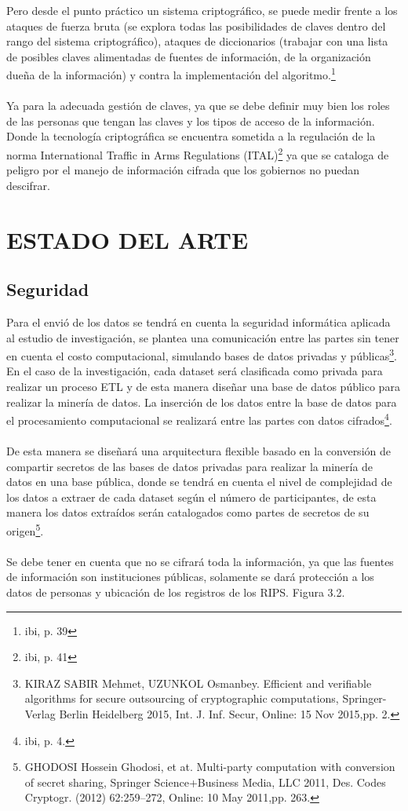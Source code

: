 \documentclass[a4paper,openright,12pt]{book}
\theoremstyle{definition}
\theoremstyle{remark}
\begin{document}
Pero desde el punto práctico un sistema criptográfico, se puede medir frente a los ataques de fuerza bruta (se explora todas las posibilidades de claves dentro del rango del sistema criptográfico),  ataques de diccionarios (trabajar con una lista de posibles claves alimentadas de fuentes de información, de la organización dueña de la información) y contra la implementación del algoritmo.\footnote{ibi, p. 39}\\\\
Ya para la adecuada gestión de claves, ya que se debe definir muy bien los roles de las personas que tengan las claves y los tipos de acceso de la información. Donde la tecnología criptográfica se encuentra sometida a la regulación de la norma International Traffic in Arms Regulations (ITAL)\footnote{ibi, p. 41} ya que se cataloga de peligro por el manejo de información cifrada que los gobiernos no puedan descifrar.  

\section{ESTADO DEL ARTE}
	\subsection{Seguridad}
Para el envió de los datos se tendrá en cuenta la seguridad informática aplicada al estudio de investigación, se plantea una comunicación entre las partes sin tener en cuenta el costo computacional, simulando bases de datos privadas y públicas\footnote{KIRAZ SABIR Mehmet, UZUNKOL Osmanbey. Efficient and verifiable algorithms for secure outsourcing of cryptographic computations, Springer-Verlag Berlin Heidelberg 2015, Int. J. Inf. Secur, Online: 15 Nov 2015,pp. 2.}. En el caso de la investigación, cada dataset será clasificada como privada para realizar un proceso ETL y de esta manera diseñar una base de datos público para realizar la minería de datos. La inserción de los datos entre la base de datos para el procesamiento computacional se realizará entre las partes con datos cifrados\footnote{ibi, p.  4.}.\\\\
De esta manera se diseñará una arquitectura flexible basado en la conversión de compartir secretos de las bases de datos privadas para realizar la minería de datos en una base pública, donde se tendrá en cuenta el nivel de complejidad de los datos a extraer de cada dataset según el número de participantes, de esta manera los datos extraídos serán catalogados como partes de secretos de su origen\footnote{GHODOSI Hossein Ghodosi, et at. Multi-party computation with conversion of secret sharing, Springer Science+Business Media, LLC 2011, Des. Codes Cryptogr. (2012) 62:259–272, Online: 10 May 2011,pp. 263.}.\\\\
Se debe tener en cuenta que no se cifrará toda la información, ya que las fuentes de información son instituciones públicas, solamente se dará protección a los datos de personas y ubicación de los registros de los RIPS. Figura 3.2.
\end{document}

